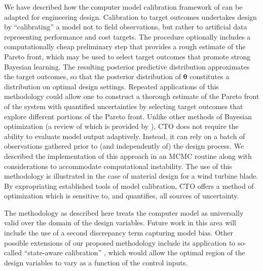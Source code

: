 \documentclass[12pt]{article}
\begin{document}
We have described how the 
computer model calibration framework of  \cite{Kennedy2001} can be adapted for engineering design. 
%
Calibration to target outcomes undertakes design by ``calibrating'' a model not to field observations, but rather to artificial data representing performance and cost targets. 
%
The procedure optionally includes a computationally cheap preliminary step that provides a rough estimate of the Pareto front, which may be used to select target outcomes that promote strong Bayesian learning.
%
The resulting posterior predictive distribution approximates the target outcomes, so that the posterior distribution of $\boldsymbol\theta$ constitutes a distribution on optimal design settings.
%
Repeated applications of this methodology could allow one to construct a thorough estimate of the Pareto front of the system with quantified uncertainties by selecting target outcomes that explore different portions of the Pareto front.
%
Unlike other methods of Bayesian optimization (a review of which is provided by \citealt{Shahriari2016}), CTO does not require the ability to evaluate model output adaptively.
%
Instead, it can rely on a batch of observations gathered prior to (and independently of) the design process.
%
We described the implementation of this approach in an MCMC routine along with considerations to accommodate computational instability.
%
The use of this methodology is illustrated in the case of material design for a wind turbine blade. 
%
%
By expropriating established tools of model calibration, CTO offers a method of optimization which is sensitive to, and quantifies, all sources of uncertainty.
%

%
The methodology as described here treats the computer model as universally valid over the domain of the design variables. 
%
Future work in this area will include the use of a second discrepancy term capturing model bias.
%
%
Other possible extensions of our proposed methodology include its application to so-called ``state-aware calibration'' \citep{Atamturktur2015,Stevens2018,Brown2016}, which would allow the optimal region of the design variables to vary as a function of the control inputs.
\end{document}
